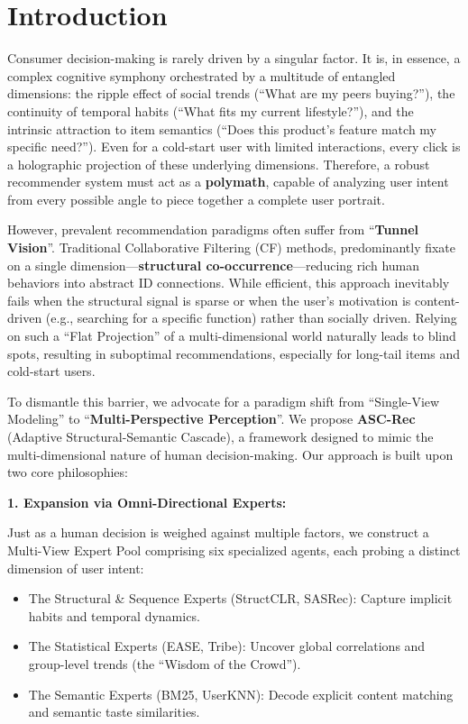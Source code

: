 \section{Introduction}
\label{sec:introduction}

Consumer decision-making is rarely driven by a singular factor. It is, in essence, a complex cognitive symphony orchestrated by a multitude of entangled dimensions: the ripple effect of social trends (``What are my peers buying?''), the continuity of temporal habits (``What fits my current lifestyle?''), and the intrinsic attraction to item semantics (``Does this product's feature match my specific need?''). Even for a cold-start user with limited interactions, every click is a holographic projection of these underlying dimensions. Therefore, a robust recommender system must act as a \textbf{polymath}, capable of analyzing user intent from every possible angle to piece together a complete user portrait.

However, prevalent recommendation paradigms often suffer from ``\textbf{Tunnel Vision}''. Traditional Collaborative Filtering (CF) methods, predominantly fixate on a single dimension---\textbf{structural co-occurrence}---reducing rich human behaviors into abstract ID connections. While efficient, this approach inevitably fails when the structural signal is sparse or when the user's motivation is content-driven (e.g., searching for a specific function) rather than socially driven. Relying on such a ``Flat Projection'' of a multi-dimensional world naturally leads to blind spots, resulting in suboptimal recommendations, especially for long-tail items and cold-start users.

To dismantle this barrier, we advocate for a paradigm shift from ``Single-View Modeling'' to ``\textbf{Multi-Perspective Perception}''. We propose \textbf{ASC-Rec} (Adaptive Structural-Semantic Cascade), a framework designed to mimic the multi-dimensional nature of human decision-making. Our approach is built upon two core philosophies:

\textbf{1. Expansion via Omni-Directional Experts:}

Just as a human decision is weighed against multiple factors, we construct a Multi-View Expert Pool comprising six specialized agents, each probing a distinct dimension of user intent:
\begin{itemize}
    \item The Structural \& Sequence Experts (StructCLR, SASRec): Capture implicit habits and temporal dynamics.
    \item The Statistical Experts (EASE, Tribe): Uncover global correlations and group-level trends (the ``Wisdom of the Crowd'').
    \item The Semantic Experts (BM25, UserKNN): Decode explicit content matching and semantic taste similarities.
\end{itemize}

